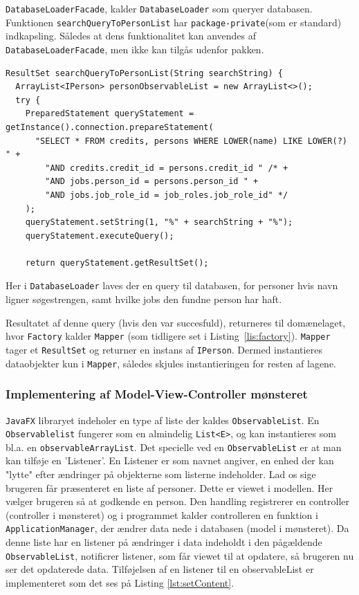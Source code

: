\texttt{DatabaseLoaderFacade}, kalder \texttt{DatabaseLoader} som queryer
databasen. Funktionen \newline\texttt{searchQueryToPersonList} har
\texttt{package-private}(som er standard) indkapsling. Således at dens
funktionalitet kan anvendes af \texttt{DatabaseLoaderFacade}, men ikke kan
tilgås udenfor pakken.

\begin{lstlisting}[basicstyle=\ttfamily\footnotesize, firstnumber=42,
caption=Query af databasen for personer (\texttt{DatabaseLoader.java})]
ResultSet searchQueryToPersonList(String searchString) {
  ArrayList<IPerson> personObservableList = new ArrayList<>();
  try {
    PreparedStatement queryStatement = getInstance().connection.prepareStatement(
      "SELECT * FROM credits, persons WHERE LOWER(name) LIKE LOWER(?) " +
        "AND credits.credit_id = persons.credit_id " /* +
        "AND jobs.person_id = persons.person_id " +
        "AND jobs.job_role_id = job_roles.job_role_id" */
    );
    queryStatement.setString(1, "%" + searchString + "%");
    queryStatement.executeQuery();

    return queryStatement.getResultSet();
\end{lstlisting}

Her i \texttt{DatabaseLoader} laves der en query til databasen, for personer
hvis navn ligner søgestrengen, samt hvilke jobs den fundne person har haft.

Resultatet af denne query (hvis den var succesfuld), returneres til domænelaget,
hvor \texttt{Factory} kalder \texttt{Mapper} (som tidligere set i
Listing~\ref{lis:factory}). \texttt{Mapper} tager et \texttt{ResultSet} og
returner en instans af \texttt{IPerson}. Dermed instantieres dataobjekter kun i
\texttt{Mapper}, således skjules instantieringen for resten af lagene.

\subsubsection{Implementering af Model-View-Controller mønsteret} 
\texttt{JavaFX}
libraryet indeholer en type af liste der kaldes \texttt{ObservableList}.  En
\texttt{Observablelist} fungerer som en almindelig \texttt{List<E>}, og kan
instantieres som bl.a. en \texttt{observableArrayList}. Det specielle ved en
\texttt{ObservableList} er at man kan tilføje en 'Listener'. En Listener er som
navnet angiver, en enhed der kan "lytte" efter ændringer på objekterne som
listerne indeholder. Lad os sige brugeren får præsenteret en liste af personer.
Dette er viewet i modellen. Her vælger brugeren så at godkende en person. Den
handling registrerer en controller (controller i mønsteret) og i programmet
kalder controlleren en funktion i \texttt{ApplicationManager}, der ændrer 
data nede i databasen (model i mønsteret). Da denne liste har en listener på
ændringer i data indeholdt i den pågældende \texttt{ObservableList}, notificrer
listener, som får viewet til at opdatere, så brugeren nu ser det opdaterede
data.  Tilføjelsen af en listener til en observableList er implementeret som
det ses på Listing \ref{lst:setContent}.

